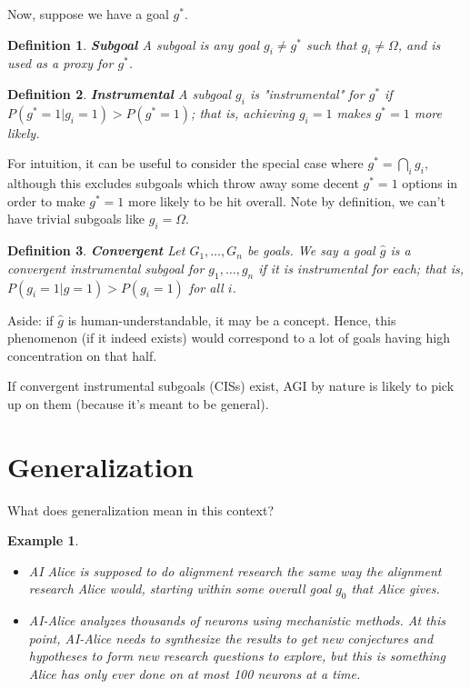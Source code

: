 \documentclass{article}
\newtheorem{definition}{Definition}
\newtheorem{example}{Example}
\begin{document}
Now, suppose we have a goal $g^*$.

\begin{definition}{\textbf{Subgoal}}
    A subgoal is any goal $g_i \neq g^*$ such that $g_i \neq \Omega$, and is used as a proxy for $g^*$.
\end{definition}

\begin{definition}{\textbf{Instrumental}}
    A subgoal $g_i$ is "instrumental" for $g^*$ if $P(g^*=1|g_i=1)>P(g^*=1)$; that is, achieving $g_i=1$ makes $g^*=1$ more likely.
\end{definition}

For intuition, it can be useful to consider the special case where $g^* = \bigcap_i g_i$, although this excludes subgoals which throw away some decent $g^*=1$ options in order to make $g^*=1$ more likely to be hit overall. Note by definition, we can't have trivial subgoals like $g_i=\Omega$.

\begin{definition}{\textbf{Convergent}}
    Let $G_1, \dots, G_n$ be goals. We say a goal $\hat{g}$ is a convergent instrumental subgoal for $g_1, \dots, g_n$ if it is instrumental for each; that is, $P(g_i=1|\hat{g}=1)>P(g_i=1)$ for all $i$.
\end{definition}

Aside: if $\hat{g}$ is human-understandable, it may be a concept. Hence, this phenomenon (if it indeed exists) would correspond to a lot of goals having high concentration on that half.


If convergent instrumental subgoals (CISs) exist, AGI by nature is likely to pick up on them (because it's meant to be general).

\section{Generalization}
What does generalization mean in this context?

\begin{example}
\begin{itemize}
    \item AI Alice is supposed to do alignment research the same way the alignment research Alice would, starting within some overall goal $g_0$ that Alice gives.
    \item AI-Alice analyzes thousands of neurons using mechanistic methods. At this point, AI-Alice needs to synthesize the results to get new conjectures and hypotheses to form new research questions to explore, but this is something Alice has only ever done on at most 100 neurons at a time.
\end{itemize}
\end{example}
\end{document}
